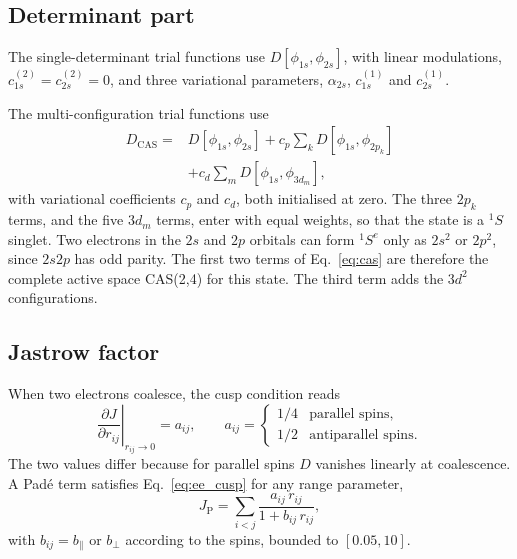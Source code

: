 \documentclass[aps,prb,reprint,amsmath,amssymb,superscriptaddress,nofootinbib]{revtex4-2}
\begin{document}
\subsection{Determinant part}
\label{ssec:determinant}

The single-determinant trial functions use $D[\phi_{1s}, \phi_{2s}]$, with
linear modulations, $c^{(2)}_{1s} = c^{(2)}_{2s} = 0$, and three variational
parameters, $\alpha_{2s}$, $c^{(1)}_{1s}$ and $c^{(1)}_{2s}$.

The multi-configuration trial functions use
\begin{equation}
\begin{aligned}
    D_{\mathrm{CAS}} = {} & D[\phi_{1s}, \phi_{2s}]
    + c_p \sum_{k} D[\phi_{1s}, \phi_{2p_k}] \\
    & + c_d \sum_{m} D[\phi_{1s}, \phi_{3d_m}] ,
\end{aligned}
    \label{eq:cas}
\end{equation}
with variational coefficients $c_p$ and $c_d$, both initialised at zero. The
three $2p_k$ terms, and the five $3d_m$ terms, enter with equal weights, so
that the state is a $^1S$ singlet. Two electrons in the $2s$ and $2p$
orbitals can form $^1S^e$ only as $2s^2$ or $2p^2$, since $2s2p$ has odd
parity. The first two terms of Eq.~\eqref{eq:cas} are therefore the complete
active space CAS(2,4) for this state. The third term adds the $3d^2$
configurations.

\subsection{Jastrow factor}
\label{ssec:jastrow}

When two electrons coalesce, the cusp condition reads~\cite{kato1957}
\begin{equation}
    \left. \frac{\partial J}{\partial r_{ij}} \right|_{r_{ij}\to 0} = a_{ij} ,
    \qquad
    a_{ij} =
    \begin{cases}
        1/4 & \text{parallel spins,}\\
        1/2 & \text{antiparallel spins.}
    \end{cases}
    \label{eq:ee_cusp}
\end{equation}
The two values differ because for parallel spins $D$ vanishes linearly at
coalescence. A Pad\'e term satisfies Eq.~\eqref{eq:ee_cusp} for any range
parameter,
\begin{equation}
    J_{\mathrm{P}} = \sum_{i<j} \frac{a_{ij}\, r_{ij}}{1 + b_{ij}\, r_{ij}} ,
    \label{eq:pade}
\end{equation}
with $b_{ij} = b_\parallel$ or $b_\perp$ according to the spins, bounded to
$[0.05, 10]$.
\end{document}
